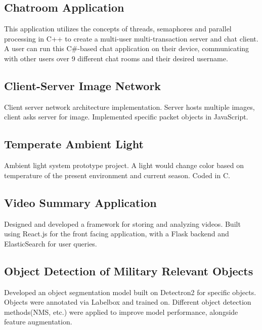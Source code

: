 \documentclass[a4paper, 12pt]{article}
\begin{document}
\subsection {{Chatroom Application}\hfill }
This application utilizes the concepts of threads, semaphores and parallel processing in C++ to create a multi-user multi-transaction server and chat client. A user can run this C\#-based chat application on their device, communicating with other users over 9 different chat rooms and their desired username.
\subsection {{}\hfill }


\subsection {{Client-Server Image Network}\hfill }
Client server network architecture implementation. Server hosts multiple images, client asks server for image. Implemented specific packet objects in JavaScript.
\subsection {{}\hfill }

\subsection {{Temperate Ambient Light}\hfill }
Ambient light system prototype project. A light would change color based on temperature of the present environment and current season. Coded in C.
\subsection {{}\hfill }

\subsection {{Video Summary Application}\hfill }
 Designed and developed a framework for storing and analyzing videos. Built using React.js for the front facing application, with a Flask backend and ElasticSearch for user queries. 

\subsection {{}\hfill }
\subsection {{Object Detection of Military Relevant Objects}\hfill }
Developed an object segmentation model built on Detectron2 for specific objects. Objects were annotated via Labelbox and trained on. Different object detection methods(NMS, etc.) were applied to improve model performance, alongside feature augmentation.
\end{document}
